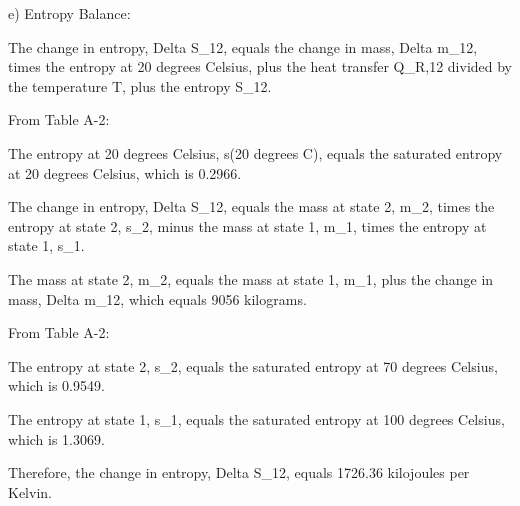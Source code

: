 e) Entropy Balance:

The change in entropy, Delta S_12, equals the change in mass, Delta m_12, times the entropy at 20 degrees Celsius, plus the heat transfer Q_R,12 divided by the temperature T, plus the entropy S_12.

From Table A-2:

The entropy at 20 degrees Celsius, s(20 degrees C), equals the saturated entropy at 20 degrees Celsius, which is 0.2966.

The change in entropy, Delta S_12, equals the mass at state 2, m_2, times the entropy at state 2, s_2, minus the mass at state 1, m_1, times the entropy at state 1, s_1.

The mass at state 2, m_2, equals the mass at state 1, m_1, plus the change in mass, Delta m_12, which equals 9056 kilograms.

From Table A-2:

The entropy at state 2, s_2, equals the saturated entropy at 70 degrees Celsius, which is 0.9549.

The entropy at state 1, s_1, equals the saturated entropy at 100 degrees Celsius, which is 1.3069.

Therefore, the change in entropy, Delta S_12, equals 1726.36 kilojoules per Kelvin.
